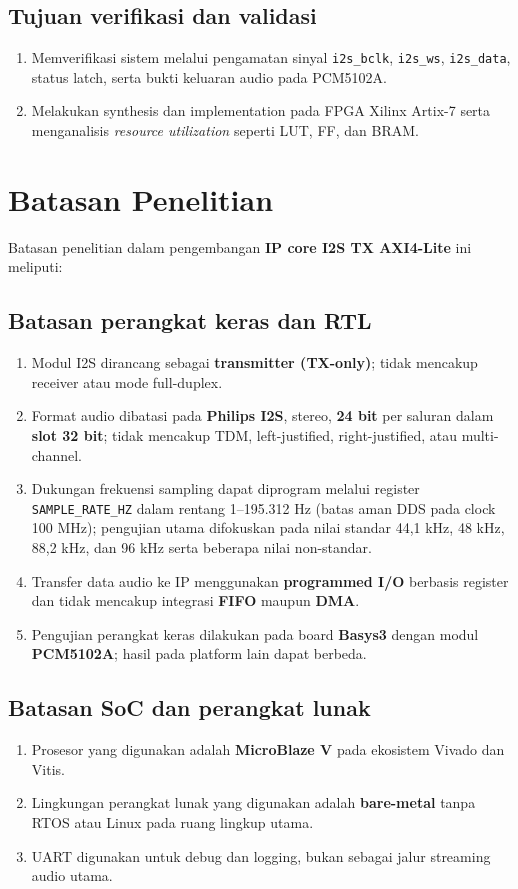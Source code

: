 \subsection{Tujuan verifikasi dan validasi}
\begin{enumerate}
	\item Memverifikasi sistem melalui pengamatan sinyal \texttt{i2s\_bclk}, \texttt{i2s\_ws}, \texttt{i2s\_data}, status latch, serta bukti keluaran audio pada PCM5102A.
	\item Melakukan synthesis dan implementation pada FPGA Xilinx Artix-7 serta menganalisis \textit{resource utilization} seperti LUT, FF, dan BRAM.
\end{enumerate}

\section{Batasan Penelitian}

Batasan penelitian dalam pengembangan \textbf{IP core I2S TX AXI4-Lite} ini meliputi:

\subsection{Batasan perangkat keras dan RTL}
\begin{enumerate}
	\item Modul I2S dirancang sebagai \textbf{transmitter (TX-only)}; tidak mencakup receiver atau mode full-duplex.
	\item Format audio dibatasi pada \textbf{Philips I2S}, stereo, \textbf{24 bit} per saluran dalam \textbf{slot 32 bit}; tidak mencakup TDM, left-justified, right-justified, atau multi-channel.
	\item Dukungan frekuensi sampling dapat diprogram melalui register \texttt{SAMPLE\_RATE\_HZ} dalam rentang 1--195.312 Hz (batas aman DDS pada clock 100 MHz); pengujian utama difokuskan pada nilai standar 44,1 kHz, 48 kHz, 88,2 kHz, dan 96 kHz serta beberapa nilai non-standar.
	\item Transfer data audio ke IP menggunakan \textbf{programmed I/O} berbasis register dan tidak mencakup integrasi \textbf{FIFO} maupun \textbf{DMA}.
	\item Pengujian perangkat keras dilakukan pada board \textbf{Basys3} dengan modul \textbf{PCM5102A}; hasil pada platform lain dapat berbeda.
\end{enumerate}

\subsection{Batasan SoC dan perangkat lunak}
\begin{enumerate}
	\item Prosesor yang digunakan adalah \textbf{MicroBlaze V} pada ekosistem Vivado dan Vitis.
	\item Lingkungan perangkat lunak yang digunakan adalah \textbf{bare-metal} tanpa RTOS atau Linux pada ruang lingkup utama.
	\item UART digunakan untuk debug dan logging, bukan sebagai jalur streaming audio utama.
\end{enumerate}

